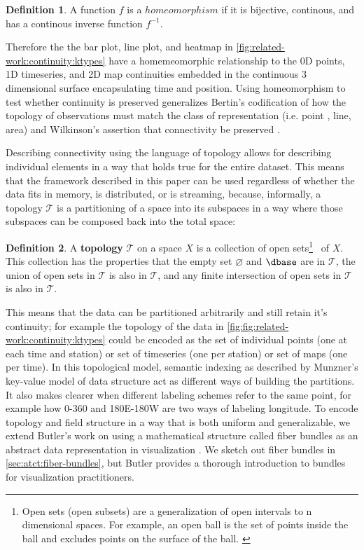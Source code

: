 \documentclass[journal]{IEEEtran}
\theoremstyle{definition}
\newtheorem{definition}{Definition}[section]
\theoremstyle{remark}
\begin{document}
\begin{definition}
  A function $f$ is a $homeomorphism$ if it is bijective, continous, and has a continous inverse function $f^{-1}$.
\end{definition}


Therefore the the bar plot, line plot, and heatmap in \autoref{fig:related-work:continuity:ktypes} have a homemeomorphic relationship to the 0D points, 1D timeseries, and 2D map continuities embedded in the continuous 3 dimensional surface encapsulating time and position. Using homeomorphism to test whether continuity is preserved generalizes Bertin's codification of how the topology of observations must match the class of representation (i.e. point , line, area) \cite{bertinSemiologyGraphicsDiagrams2011} and Wilkinson's assertion that connectivity be preserved \cite{wilkinsonGrammarGraphics2005}.

Describing connectivity using the language of topology allows for describing individual elements in a way that holds true for the entire dataset. This means that the framework described in this paper can be used regardless of whether the data fits in memory, is distributed, or is streaming, because, informally, a topology $\mathcal{T}$ is a partitioning of a space into its subspaces in a way where those subspaces can be composed back into the total space:

\begin{definition}
A \textbf{topology} $\mathcal{T}$ on a space $X$ is a collection of open sets\footnote{Open sets (open subsets) are a generalization of open intervals to n dimensional spaces. For example, an open ball is the set of points inside the ball and excludes points on the surface of the ball. \cite{weissteinOpenSet,bradleyTopologyVsTopology}} \openset\ of $X$. This collection has the properties that the empty set $\varnothing$ and $\dbase$ are in $\mathcal{T}$, the union of open sets in $\mathcal{T}$ is also in $\mathcal{T}$, and any finite intersection of open sets in $\mathcal{T}$ is also in $\mathscr{T}$. \cite{bradleyTopologyCategoricalApproach2020}
\end{definition}

This means that the data can be partitioned arbitrarily and still retain it's continuity; for example the topology of the data in \autoref{fig:fig:related-work:continuity:ktypes} could be encoded as the set of individual points (one at each time and station) or set of timeseries (one per station) or set of maps (one per time). In this topological model, semantic indexing as described by Munzner's key-value model of data structure act as different ways of building the partitions. It also makes clearer when different labeling schemes refer to the same point, for example how 0-360 and 180E-180W are two ways of labeling longitude. To encode topology and field structure in a way that is both uniform and generalizable, we extend Butler's work on using a mathematical structure called fiber bundles as an abstract data representation in visualization \cite{butlerVectorBundleClassesForm1992, butlerVisualizationModelBased1989}. We sketch out fiber bundles in \autoref{sec:atct:fiber-bundles}, but Butler provides a thorough introduction to bundles for visualization practitioners.
\end{document}
